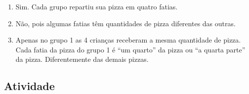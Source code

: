 \documentclass[a4paper,12pt,twoside]{book}
\begin{document}
\begin{resposta*}[breakable]{}{}  
\begin{enumerate} [\quad I)] %
    \item       Sim. Cada grupo repartiu sua pizza em quatro fatias.
    \item       Não, pois algumas fatias têm quantidades de pizza diferentes das outras.
    \item       Apenas no grupo 1 as 4 crianças receberam a mesma quantidade de pizza. Cada fatia da pizza do grupo 1 é       ``um quarto''       da pizza ou       ``a quarta parte''       da pizza. Diferentemente das demais pizzas.
\end{enumerate} %
  
\end{resposta*}




\subsection{Atividade}
\end{document}
